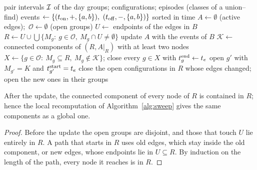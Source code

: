 \begin{algorithm}[htbp]
\caption{Phase 4: sweep over the events of one day}\label{alg:sweep}
\begin{algorithmic}[1]
\Require pair intervals $\mathcal{I}$ of the day
\Ensure groups; configurations; episodes (classes of a union--find)
\State events $\gets\{(t_{\rm on},+,\{a,b\}),\ (t_{\rm off},-,\{a,b\})\}$ sorted in time
\State $A\gets\emptyset$ (active edges);\ $\mathcal{O}\gets\emptyset$ (open groups)
  \State $U\gets$ endpoints of the edges in $B$ 
  \State $R\gets U\cup\bigcup\{M_g:\ g\in\mathcal{O},\ M_g\cap U\ne\emptyset\}$
  \State update $A$ with the events of $B$
  \State $\mathcal{K}\gets$ connected components of $(R, A|_R)$ with at least two nodes 
  \State $X\gets\{g\in\mathcal{O}:\ M_g\subseteq R,\ M_g\notin\mathcal{K}\}$; close every $g\in X$ with $t^{\rm end}_g\gets t_e$
    \State open $g'$ with $M_{g'}=K$ and $t^{\rm start}_{g'}=t_e$
      \State {}
    \EndFor
  \EndFor
  \State close the open configurations in $R$ whose edges changed; open the new ones in their groups
\EndFor
\end{algorithmic}
\end{algorithm}

\begin{lemma}\label{lem:local}
After the update, the connected component of every node of $R$ is contained in $R$; hence the
local recomputation of Algorithm~\ref{alg:sweep} gives the same components as a global one.
\end{lemma}

\begin{proof}
Before the update the open groups are disjoint, and those that touch $U$ lie entirely in
$R$. A path that starts in $R$ uses old edges, which stay inside the old component, or new edges,
whose endpoints lie in $U\subseteq R$. By induction on the length of the path, every node it
reaches is in $R$.
\end{proof}

